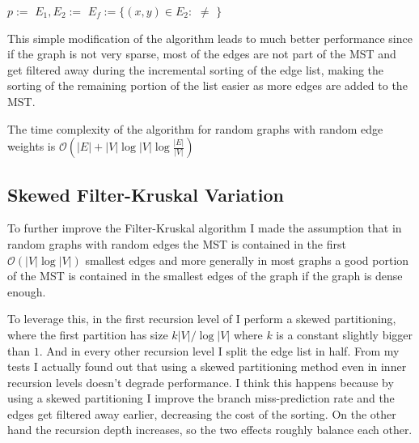 \documentclass{article}
\begin{document}
\begin{algorithm}
    \begin{algorithmic}
                \State \Return {}
            \EndIf
            \State $p := $ 
            \State $E_1, E_2 := $ 
            \State {}
                \State $E_f := \{(x, y) \in E_2 : $  $\neq$ $\}$ 
                \State {}
            \EndIf
        \EndFunction
    \end{algorithmic}
\end{algorithm}

This simple modification of the algorithm leads to much better performance since if the graph is not very sparse, most of the edges are not part of the MST and get filtered away during the incremental sorting of the edge list, making the sorting of the remaining portion of the list easier as more edges are added to the MST.

The time complexity of the algorithm for random graphs with random edge weights is $\mathcal{O}(\lvert E\rvert + \lvert V\rvert \log \lvert V \rvert \log \frac{\lvert E \rvert}{\lvert V\rvert})$

\subsection{Skewed Filter-Kruskal Variation}

To further improve the Filter-Kruskal algorithm I made the assumption that in random graphs with random edges the MST is contained in the first $\mathcal{O}(\lvert V\rvert\log \lvert V\rvert)$ smallest edges and more generally in most graphs a good portion of the MST is contained in the smallest edges of the graph if the graph is dense enough. 

To leverage this, in the first recursion level of  I perform a skewed partitioning, where the first partition has size $k\lvert V \rvert /\log \lvert V\rvert$ where $k$ is a constant slightly bigger than $1$. And in every other recursion level I split the edge list in half. From my tests I actually found out that using a skewed partitioning method even in inner recursion levels doesn't degrade performance. I think this happens because by using a skewed partitioning I improve the branch miss-prediction rate and the edges get filtered away earlier, decreasing the cost of the sorting. On the other hand the recursion depth increases, so the two effects roughly balance each other.
\end{document}
